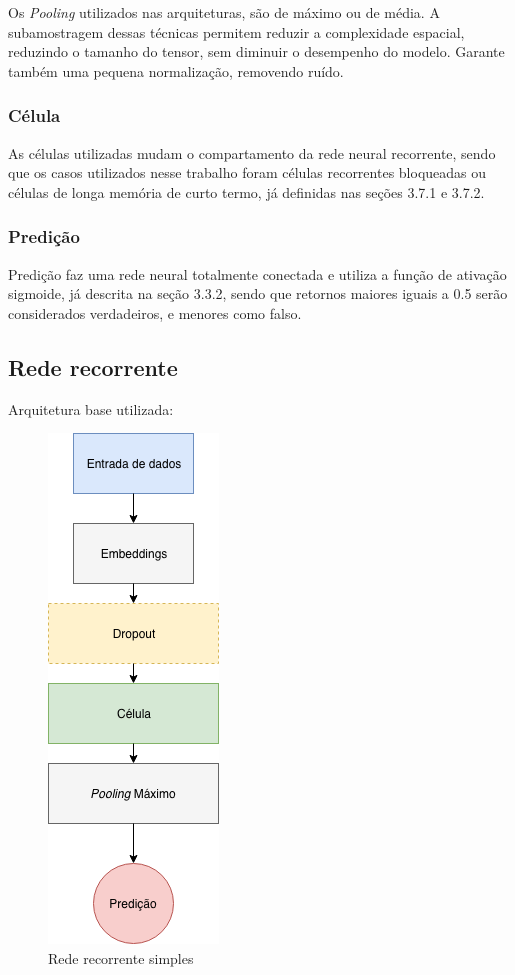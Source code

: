 \documentclass[12pt]{article}
\begin{document}
\subsubsection{}

Os \textit{Pooling} utilizados nas arquiteturas, são de máximo ou de média. A subamostragem dessas técnicas permitem reduzir a complexidade espacial, reduzindo o tamanho do tensor, sem diminuir o desempenho do modelo. Garante também uma pequena normalização, removendo ruído.

\subsubsection{Célula}

As células utilizadas mudam o compartamento da rede neural recorrente, sendo que os casos utilizados nesse trabalho foram células recorrentes bloqueadas ou células de longa memória de curto termo, já definidas nas seções 3.7.1 e 3.7.2.

\subsubsection{Predição}

Predição faz uma rede neural totalmente conectada e utiliza a função de ativação sigmoide, já descrita na seção 3.3.2,  sendo que retornos maiores iguais a 0.5 serão considerados verdadeiros, e menores como falso.

\subsection{Rede recorrente}

Arquitetura base utilizada:

\begin{figure}[!htb]
\centering
\includegraphics[width=.2\textwidth]{images/graph_2.png}
\caption{Rede recorrente simples}
\label{fig:graph_2}
\end{figure}
\end{document}
